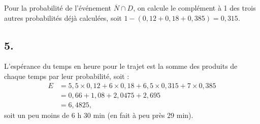 Pour la probabilité de l'événement \(\overline{N} \cap D\), on calcule le complément à 1 des trois autres probabilités déjà calculées, soit \(1 - (0{,}12 + 0{,}18 + 0{,}385) = 0{,}315\).

\subsection*{5.}

L'espérance du temps en heure pour le trajet est la somme des produits de chaque temps par leur probabilité, soit :
\begin{align*}
E &= 5{,}5 \times 0{,}12 + 6 \times 0{,}18 + 6{,}5 \times 0{,}315 + 7 \times 0{,}385 \\
&= 0{,}66 + 1{,}08 + 2{,}0475 + 2{,}695 \\
&= 6{,}4825,
\end{align*}
soit un peu moins de 6 h 30 min (en fait à peu près 29 min).
